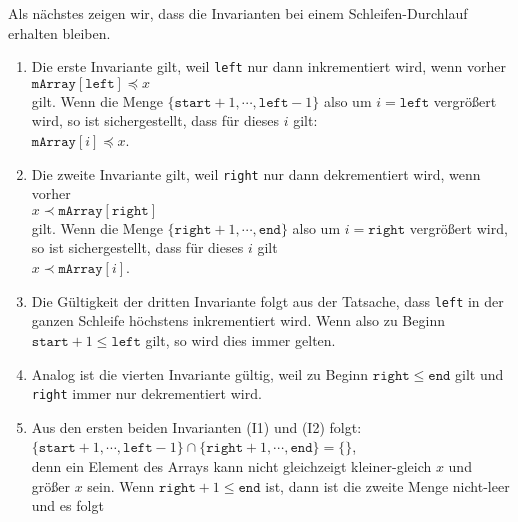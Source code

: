 \noindent
Als n\"achstes zeigen wir, dass die Invarianten bei einem Schleifen-Durchlauf erhalten
bleiben.  
\begin{enumerate}
\item Die erste Invariante gilt, weil \texttt{left} nur dann inkrementiert wird,
      wenn vorher \\[0.1cm]
      \hspace*{1.3cm} $\texttt{mArray}[\texttt{left}] \preceq x$ \\[0.1cm]
      gilt.  Wenn die Menge $\{\mathtt{start}+1, \cdots, \mathtt{left}-1\}$ also um 
      $i = \mathtt{left}$ vergr\"o\ss{}ert wird, so ist sichergestellt, dass f\"ur dieses $i$ gilt:
      \\[0.1cm]
      \hspace*{1.3cm} $\texttt{mArray}[i] \preceq x$.
\item Die zweite Invariante gilt, weil \texttt{right} nur dann dekrementiert wird,
      wenn vorher \\[0.1cm]
      \hspace*{1.3cm} $x \prec \texttt{mArray}[\texttt{right}]$ \\[0.1cm]
      gilt.  Wenn die Menge $\{\mathtt{right}+1, \cdots, \mathtt{end}\}$ also um 
      $i = \mathtt{right}$ vergr\"o\ss{}ert wird, so ist sichergestellt, dass f\"ur dieses $i$ gilt
      \\[0.1cm]
      \hspace*{1.3cm} $x \prec \texttt{mArray}[i]$.
\item Die G\"ultigkeit der dritten Invariante folgt aus der Tatsache, dass \texttt{left}
      in der ganzen Schleife h\"ochstens inkrementiert wird.  Wenn also zu Beginn 
      $\mathtt{start} + 1 \leq \mathtt{left}$ gilt, so wird dies immer gelten.  
\item Analog ist die vierten Invariante g\"ultig, weil zu Beginn $\mathtt{right} \leq \mathtt{end}$ gilt und
      \texttt{right} immer nur dekrementiert wird.
\item Aus den ersten beiden Invarianten (I1) und (I2) folgt: \\[0.1cm]
      \hspace*{1.3cm} 
      $\{ \mathtt{start}+1, \cdots, \mathtt{left} - 1 \} \cap \{ \mathtt{right}+1, \cdots, \mathtt{end} \} = \{\}$,
      \\[0.1cm]
      denn ein Element des Arrays kann nicht gleichzeigt kleiner-gleich $x$ und 
      gr\"o\ss{}er $x$ sein.
      Wenn $\texttt{right} + 1 \leq \texttt{end}$ ist, dann ist die zweite Menge
      nicht-leer und es folgt \\[0.1cm]

\end{enumerate}
